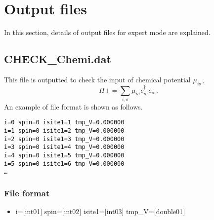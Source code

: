 \newpage
\section{Output files}
\label{Sec:outputfile}
In this section, details of output files for expert mode are explained.
\subsection{CHECK\_Chemi.dat}
\label{Subsec:checkchemi}
This file is outputted to check the input of chemical potential $\mu_{i\sigma}$,
\begin{equation}
H+=\sum_{i,\sigma} \mu_{i\sigma} c_{i\sigma}^{\dagger}c_{i\sigma}.
\end{equation}
An example of file format is shown as follows.

\begin{minipage}{12.5cm}
\begin{screen}
\begin{verbatim}
i=0 spin=0 isite1=1 tmp_V=0.000000 
i=1 spin=0 isite1=2 tmp_V=0.000000 
i=2 spin=0 isite1=3 tmp_V=0.000000 
i=3 spin=0 isite1=4 tmp_V=0.000000 
i=4 spin=0 isite1=5 tmp_V=0.000000 
i=5 spin=0 isite1=6 tmp_V=0.000000 
…
\end{verbatim}
\end{screen}
\end{minipage}

\subsubsection{File format}
 \begin{itemize}
   \item  i=$[$int01$]$ spin=$[$int02$]$ isite1=$[$int03$]$ tmp\_V=$[$double01$]$ 
 \end{itemize}
  
